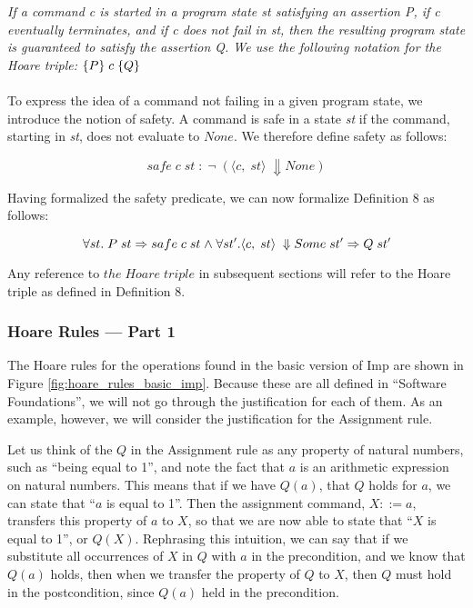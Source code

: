  \textit{If a command c is started in a program state st satisfying an assertion P, if c eventually terminates, and if c does not fail in st, then the resulting program state is guaranteed to satisfy the assertion Q. We use the following notation for the Hoare triple: } $\{{P}\}{\;c\;}\{{Q}\}$

\paragraph{}
To express the idea of a command not failing in a given program state, we introduce the notion of safety. A command is safe in a state {\it st} if the command, starting in {\it st}, does not evaluate to $None$. We therefore define safety as follows:

\[ \mathit{safe\;c\;st\;: \;\neg \;(\langle c,\;st\rangle\;\Downarrow None)}\]

Having formalized the safety predicate, we can now formalize Definition 8 as follows:

\[
\forall st.\; P\;st \Rightarrow safe\;c\;st \mathrel{\wedge} \forall st'. \langle c,\;st\rangle\;\Downarrow Some\; st' \Rightarrow Q\;st'
\]

Any reference to $the\;Hoare\;triple$ in subsequent sections will refer to the Hoare triple as defined in Definition 8.

\subsubsection{Hoare Rules --- Part 1}
The Hoare rules for the operations found in the basic version of Imp are shown in Figure \ref{fig:hoare_rules_basic_imp}. Because these are all defined in ``Software Foundations'', we will not go through the justification for each of them. As an example, however, we will consider the justification for the Assignment rule.

Let us think of the $Q$ in the Assignment rule as any property of natural numbers, such as ``being equal to 1'', and note the fact that $a$ is an arithmetic expression on natural numbers. This means that if we have $Q(a)$, that $Q$ holds for $a$, we can state that ``$a$ is equal to 1''. Then the assignment command, $X ::= a$, transfers this property of $a$ to $X$, so that we are now able to state that ``$X$ is equal to 1'', or $Q(X)$. Rephrasing this intuition, we can say that if we substitute all occurrences of $X$ in $Q$ with $a$ in the precondition, and we know that $Q(a)$ holds, then when we transfer the property of $Q$ to $X$, then $Q$ must hold in the postcondition, since $Q(a)$ held in the precondition.

